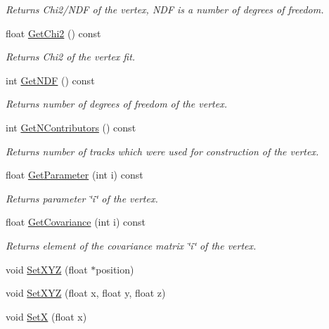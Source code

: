 \begin{DoxyCompactItemize}
\begin{DoxyCompactList}\small\item\em Returns Chi2/\+N\+DF of the vertex, N\+DF is a number of degrees of freedom. \end{DoxyCompactList}\item 
float \hyperlink{classKFPVertex_a172744bf6e2a9a3bd4c5bfb2420acf77}{Get\+Chi2} () const \hypertarget{classKFPVertex_a172744bf6e2a9a3bd4c5bfb2420acf77}{}\label{classKFPVertex_a172744bf6e2a9a3bd4c5bfb2420acf77}

\begin{DoxyCompactList}\small\item\em Returns Chi2 of the vertex fit. \end{DoxyCompactList}\item 
int \hyperlink{classKFPVertex_a51e1f8df396bb4b05e5eb41d070b4a36}{Get\+N\+DF} () const \hypertarget{classKFPVertex_a51e1f8df396bb4b05e5eb41d070b4a36}{}\label{classKFPVertex_a51e1f8df396bb4b05e5eb41d070b4a36}

\begin{DoxyCompactList}\small\item\em Returns number of degrees of freedom of the vertex. \end{DoxyCompactList}\item 
int \hyperlink{classKFPVertex_a321dd26ba4bd5f3d62448df30585d326}{Get\+N\+Contributors} () const \hypertarget{classKFPVertex_a321dd26ba4bd5f3d62448df30585d326}{}\label{classKFPVertex_a321dd26ba4bd5f3d62448df30585d326}

\begin{DoxyCompactList}\small\item\em Returns number of tracks which were used for construction of the vertex. \end{DoxyCompactList}\item 
float \hyperlink{classKFPVertex_a9838b2b30d2b861522511abcb7179af4}{Get\+Parameter} (int i) const 
\begin{DoxyCompactList}\small\item\em Returns parameter \char`\"{}i\char`\"{} of the vertex. \end{DoxyCompactList}\item 
float \hyperlink{classKFPVertex_a871292a16c518a101587eb6afd034f4c}{Get\+Covariance} (int i) const 
\begin{DoxyCompactList}\small\item\em Returns element of the covariance matrix \char`\"{}i\char`\"{} of the vertex. \end{DoxyCompactList}\item 
void \hyperlink{classKFPVertex_a83b2d67398746613e079f20134209e22}{Set\+X\+YZ} (float $\ast$position)
\item 
void \hyperlink{classKFPVertex_a2f58a966b373d4ca82c99d3c0e063e61}{Set\+X\+YZ} (float x, float y, float z)
\item 
void \hyperlink{classKFPVertex_ac737d17f674d5beb4fd0598e5599a110}{SetX} (float x)\hypertarget{classKFPVertex_ac737d17f674d5beb4fd0598e5599a110}{}\label{classKFPVertex_ac737d17f674d5beb4fd0598e5599a110}


\end{DoxyCompactItemize}
